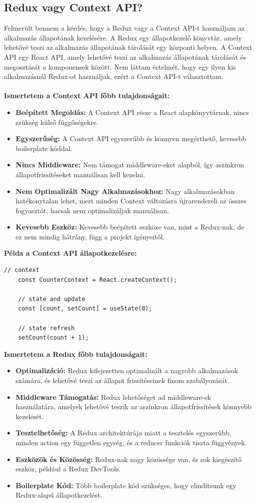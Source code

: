 \subsection*{Redux vagy Context API?}
Felmerült bennem a kérdés, hogy a Redux vagy a Context API-t használjam az alkalmazás állapotának kezelésére.
A Redux egy állapotkezelő könyvtár, amely lehetővé teszi az alkalmazás állapotának tárolását egy központi helyen.
A Context API egy React API, amely lehetővé teszi az alkalmazás állapotának tárolását és megosztását a komponensek között.
Nem láttam értelmét, hogy egy ilyen kis alkalmazásnál Redux-ot használjak, ezért a Context API-t választottam.
\\
\\
\textbf{Ismertetem a Context API főbb tulajdonságait:}
\begin{itemize}
    \item \textbf{Beépített Megoldás:} A Context API része a React alapkönyvtárnak, nincs szükség külső függőségekre.
    \item \textbf{Egyszerűség:} A Context API egyszerűbb és könnyen megérthető, kevesebb boilerplate kóddal.
    \item \textbf{Nincs Middleware:} Nem támogat middleware-eket alapból, így aszinkron állapotfrissítéseket manuálisan kell kezelni.
    \item \textbf{Nem Optimalizált Nagy Alkalmazásokhoz:} Nagy alkalmazásokban hatékonytalan lehet, mert minden Context változásra újrarendereli az összes fogyasztót, hacsak nem optimalizáljuk manuálisan.
    \item \textbf{Kevesebb Eszköz:} Kevesebb beépített eszköze van, mint a Redux-nak, de ez nem mindig hátrány, függ a projekt igényeitől.
\end{itemize}
\textbf{Példa a Context API állapotkezelésre:}
\begin{lstlisting}[style=es6, morekeywords={document, P5, katex}]
    // context
    const CounterContext = React.createContext();
    
    // state and update
    const [count, setCount] = useState(0);
    
    // state refresh
    setCount(count + 1);
\end{lstlisting}
\textbf{Ismertetem a Redux főbb tulajdonságait:}
\begin{itemize}
    \item \textbf{Optimalizáció:} Redux kifejezetten optimalizált a nagyobb alkalmazások számára, és lehetővé teszi az állapot frissítéseinek finom szabályozását.
    \item \textbf{Middleware Támogatás:} Redux lehetőséget ad middleware-ek használatára, amelyek lehetővé teszik az aszinkron állapotfrissítések könnyebb kezelését.
    \item \textbf{Tesztelhetőség:} A Redux architektúrája miatt a tesztelés egyszerűbb, minden action egy független egység, és a reducer funkciók tiszta függvények.
    \item \textbf{Eszközök és Közösség:} Redux-nak nagy közössége van, és sok kiegészítő eszköz, például a Redux DevTools.
    \item \textbf{Boilerplate Kód:} Több boilerplate kód szükséges, hogy elindítsunk egy Redux-alapú állapotkezelést.
\end{itemize}
